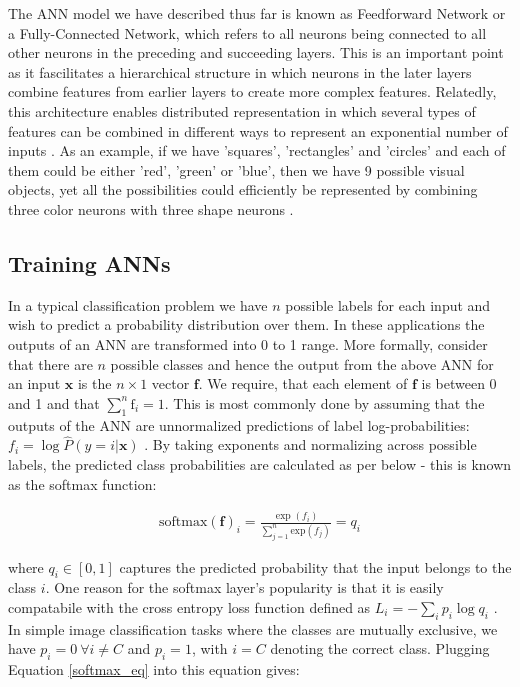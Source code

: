 \documentclass[12pt]{report}
\begin{document}
The ANN model we have described thus far is known as Feedforward Network or a Fully-Connected Network, which refers to all neurons being connected to all other neurons in the preceding and succeeding layers. This is an important point as it fascilitates a hierarchical structure in which neurons in the later layers combine features from earlier layers to create more complex features. Relatedly, this architecture enables distributed representation in which several types of features can be combined in different ways to represent an exponential number of inputs \cite{Hinton1985}. As an example, if we have 'squares', 'rectangles' and 'circles' and each of them could be either 'red', 'green' or 'blue', then we have 9 possible visual objects, yet all the possibilities could efficiently be represented by combining three color neurons with three shape neurons \cite{Goodfellow2016}. 

\subsection{Training ANNs} \label{sec:trainANN}

In a typical classification problem we have $n$ possible labels for each input and wish to predict a probability distribution over them. In these applications the outputs of an ANN are transformed into 0 to 1 range. More formally, consider that there are $n$ possible classes and hence the output from the above ANN for an input $\mathbf{x}$ is the $n \times 1$ vector $\mathbf{f}$. We require, that each element of $\mathbf{f}$ is between 0 and 1 and that $\sum_1^n \text{f}_i = 1$. This is most commonly done by assuming that the outputs of the ANN are unnormalized predictions of label log-probabilities: $f_i = \log \hat{P}(y = i | \mathbf{x})$ \cite{Goodfellow2016}. By taking exponents and normalizing across possible labels, the predicted class probabilities are calculated as per below - this is known as the softmax function:

\begin{align} \label{softmax_eq}
  \text{softmax}(\mathbf{f})_i = \frac{\exp (f_i)}{\sum_{j=1}^n \text{exp}(f_j)}=q_i
\end{align}

where $q_i \in [0,1]$ captures the predicted probability that the input belongs to the class $i$. One reason for the softmax layer's popularity is that it is easily compatabile with the cross entropy loss function defined as $L_i=-\sum_i p_i \log q_i$ \cite{Shannon1948}. In simple image classification tasks where the classes are mutually exclusive, we have $p_i=0 \ \forall i\ne C$ and $p_i=1$, with $i=C$ denoting the correct class. Plugging Equation \ref{softmax_eq} into this equation gives:
\end{document}
